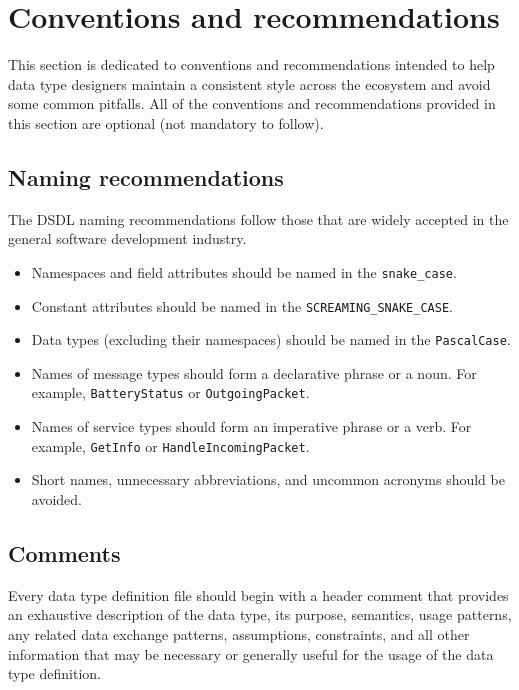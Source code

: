 \section{Conventions and recommendations}

This section is dedicated to conventions and recommendations
intended to help data type designers maintain a consistent style across the ecosystem
and avoid some common pitfalls.
All of the conventions and recommendations provided in this section are optional (not mandatory to follow).

\subsection{Naming recommendations}

The DSDL naming recommendations follow those that are widely accepted in the general software development industry.

\begin{itemize}
    \item Namespaces and field attributes should be named in the \verb|snake_case|.
    \item Constant attributes should be named in the \verb|SCREAMING_SNAKE_CASE|.
    \item Data types (excluding their namespaces) should be named in the \verb|PascalCase|.
    \item Names of message types should form a declarative phrase or a noun. For example,
          \verb|BatteryStatus| or \verb|OutgoingPacket|.
    \item Names of service types should form an imperative phrase or a verb. For example,
          \verb|GetInfo| or \verb|HandleIncomingPacket|.
    \item Short names, unnecessary abbreviations, and uncommon acronyms should be avoided.
\end{itemize}

\subsection{Comments}

Every data type definition file should begin with a header comment that provides an exhaustive description
of the data type, its purpose, semantics, usage patterns, any related data exchange patterns,
assumptions, constraints, and all other information that may be necessary or generally useful for the usage of the
data type definition.

